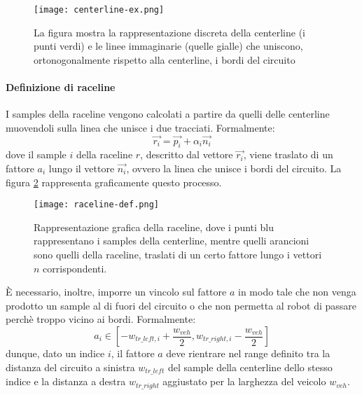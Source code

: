 \begin{figure}[h]
	\begin{center}
		\texttt{[image: centerline-ex.png]}
	\end{center}
	\caption{La figura mostra la rappresentazione discreta della centerline (i punti verdi) e le linee
		immaginarie (quelle gialle) che uniscono, ortonogonalmente rispetto alla centerline, i bordi
		del circuito}\label{fig:centerline-ex}
\end{figure}

\paragraph{Definizione di raceline}
\label{par:raceline}
I samples della raceline vengono calcolati a partire da quelli delle centerline muovendoli sulla linea
che unisce i due tracciati. Formalmente:
\[
	\overrightarrow{r_i} = \overrightarrow{p_i} + \alpha_i \overrightarrow{n_i}
\]
dove il sample $i$ della raceline $r$, descritto dal vettore $\overrightarrow{r_i}$, viene traslato di un
fattore $a_i$ lungo il vettore $\overrightarrow{n_i}$, ovvero la linea che unisce i bordi del circuito.
La figura \ref{fig:raceline-def} rappresenta graficamente questo processo.

\begin{figure}[h]
	\begin{center}
		\texttt{[image: raceline-def.png]}
	\end{center}
	\caption{Rappresentazione grafica della raceline, dove i punti blu rappresentano i samples della
		centerline, mentre quelli arancioni sono quelli della raceline, traslati di un certo fattore lungo i
		vettori $n$ corrispondenti.}
	\label{fig:raceline-def}
\end{figure}

È necessario, inoltre, imporre un vincolo sul fattore $a$ in modo tale che non venga prodotto un sample
al di fuori del circuito o che non permetta al robot di passare perchè troppo vicino ai bordi.
Formalmente:
\begin{equation}
	a_i \in [ -w_{tr\_left, i} + \frac{w_{veh}}{2}, w_{tr\_right, i} - \frac{w_{veh}}{2}]
	\label{eq:a_constr}
\end{equation}
dunque, dato un indice $i$, il fattore $a$ deve rientrare nel range definito tra la distanza del circuito
a sinistra $w_{tr\_left}$ del sample della centerline dello stesso indice e la distanza a destra
$w_{tr\_right}$ aggiustato per la larghezza del veicolo $w_{veh}$.

